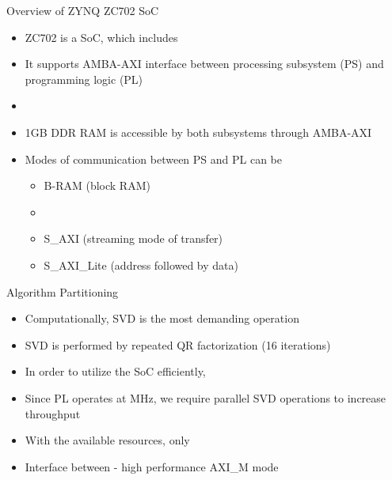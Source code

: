 \documentclass[11pt]{beamer}
\begin{document}
\begin{frame}{Overview of ZYNQ ZC702 SoC}
	\begin{itemize}
		\item ZC702 is a SoC, which includes 
		\item It supports AMBA-AXI interface between processing subsystem (PS) and programming logic (PL)
		\item {}
		\item 1GB DDR RAM is accessible by both subsystems through AMBA-AXI
		\item Modes of communication between PS and PL can be
		\begin{itemize}
			\item B-RAM (block RAM)
			\item {}
			\item S\_AXI (streaming mode of transfer)
			\item S\_AXI\_Lite (address followed by data)
		\end{itemize}
	\end{itemize}
\end{frame}

\begin{frame}{Algorithm Partitioning}
	\begin{itemize}
		\item Computationally, SVD is the most demanding operation
		\item SVD is performed by repeated QR factorization (16 iterations)
		\item In order to utilize the SoC efficiently, 
		\item Since PL operates at  MHz, we require parallel SVD operations to increase throughput
		\item With the available resources, only 
		\item Interface between  - high performance AXI\_M mode
	\end{itemize}
\end{frame}
\end{document}
